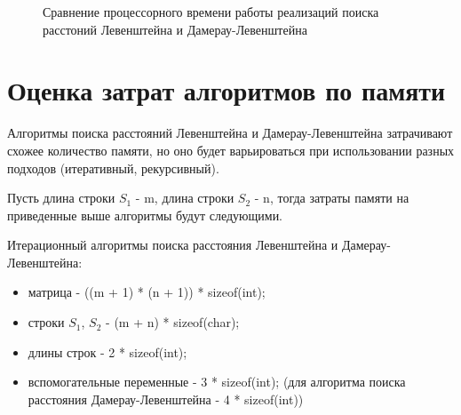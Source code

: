 \begin{figure}[h!]
	
	
	\caption{Сравнение процессорного времени работы реализаций поиска расстоний Левенштейна и Дамерау-Левенштейна}
	
	\label{fig:fig3}
	
\end{figure}

\FloatBarrier

\section{Оценка затрат алгоритмов по памяти}

Алгоритмы поиска расстояний Левенштейна и Дамерау-Левенштейна затрачивают схожее количество памяти, но оно будет варьироваться при использовании разных подходов (итеративный, рекурсивный).

Пусть длина строки $S_1$ - m, длина строки $S_2$ - n, тогда затраты памяти на приведенные выше алгоритмы будут следующими.

Итерационный алгоритмы поиска расстояния Левенштейна и Дамерау-Левенштейна:\\
\begin{itemize}
\item матрица - ((m + 1) * (n + 1)) * sizeof(int); 
\item строки $S_1$, $S_2$ - (m + n) * sizeof(char); 
\item длины строк - 2 * sizeof(int); 
\item вспомогательные переменные -  3 * sizeof(int); (для алгоритма поиска расстояния Дамерау-Левенштейна - 4 * sizeof(int))
\end{itemize}

